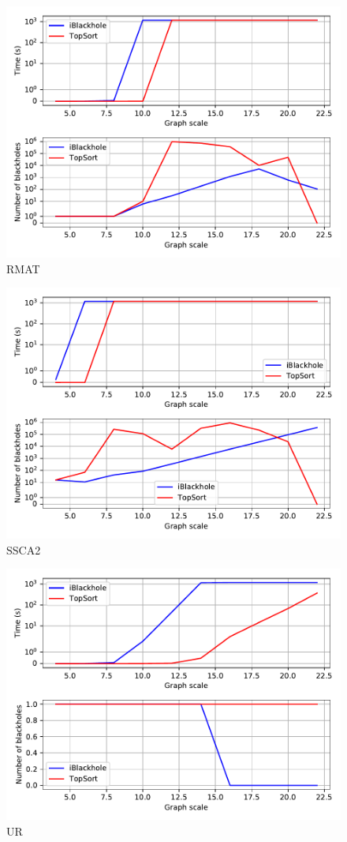 \documentclass{svproc}
\begin{document}
%
%



\begin{figure}[p]
    \includegraphics[width=\linewidth]{rmat.pdf}
    \caption{RMAT}
    \label{fig:rmat}
\end{figure}
\begin{figure}[p]
    \includegraphics[width=\linewidth]{ssca2.pdf}
    \caption{SSCA2}
    \label{fig:ssca2}
\end{figure}
\begin{figure}[p]
    \includegraphics[width=\linewidth]{ur.pdf}
    \caption{UR}
    \label{fig:ur}
\end{figure}
\end{document}
